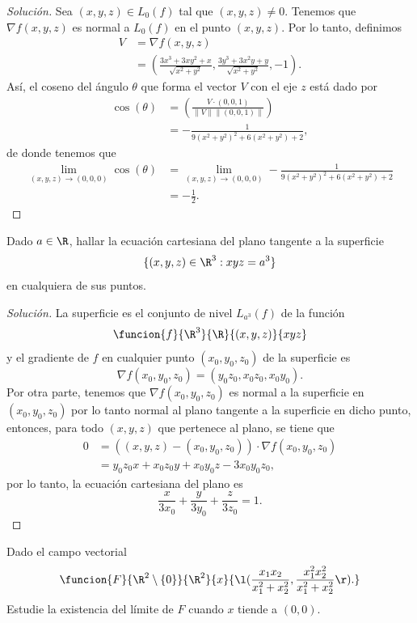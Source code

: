 \documentclass[a4,11pt]{aleph-notas}
\begin{document}
\begin{proof}[Solución]
Sea $(x,y,z)\in L_0(f)$ tal que $(x,y,z)\neq 0$. Tenemos que $\nabla f(x,y,z)$ es normal a $L_0(f)$ en el punto $(x,y,z)$. Por lo tanto, definimos
    \begin{align*}
        V
            & =\nabla f(x,y,z)\\
            & =\left(\frac{3x^3+3xy^2+x}{\sqrt{x^2+y^2}},\frac{3y^3+3x^2y+y}{\sqrt{x^2+y^2}},-1\right).
    \end{align*}
    Así, el coseno del ángulo $\theta$ que forma el vector $V$ con el eje $z$ está dado por
    \begin{align*}
        \cos (\theta)
            & = \left( \frac{V \cdot (0,0,1)}{\|V\| \|(0,0,1)\|} \right) \\
            & = -\frac{1}{9(x^2+y^2)^2+6(x^2+y^2)+2},
    \end{align*}
    de donde tenemos que
    \begin{align*}
        \lim_{(x,y,z) \to (0,0,0)}\cos (\theta)
            & = \lim_{(x,y,z) \to (0,0,0)} -\frac{1}{9(x^2+y^2)^2+6(x^2+y^2)+2} \\
            & = -\frac{1}{2}.
    \end{align*}
\end{proof}

\begin{ejer}
Dado $a\in\R$, hallar la ecuación cartesiana del plano tangente a la superficie 
    \[
       \{(x,y,z)\in\R^3 : xyz=a^3\}
    \]
    en cualquiera de sus puntos.
\end{ejer}

\begin{proof}[Solución]
La superficie es el conjunto de nivel $L_{a^3}(f)$ de la función 
    \[ 
        \funcion {f}{\R^3}{\R}{(x,y,z)}{xyz}
    \]
    y el gradiente de $f$ en cualquier punto $(x_0,y_0,z_0)$ de la superficie es
    \[
        \nabla f(x_0,y_0,z_0)=(y_0z_0,x_0z_0,x_0y_0).
    \]
    Por otra parte, tenemos que $\nabla f(x_0,y_0,z_0)$ es normal a la superficie en $(x_0,y_0,z_0)$ por lo tanto normal al plano tangente a la superficie en dicho punto, entonces, para todo $(x,y,z)$ que pertenece al plano, se tiene que
    \begin{align*}
        0
            & = ((x,y,z)-(x_0,y_0,z_0)) \cdot \nabla f(x_0,y_0,z_0) \\
            & = y_0z_0x+x_0z_0y+x_0y_0z-3x_0y_0z_0,
    \end{align*}
    por lo tanto, la ecuación cartesiana del plano es
    \[
        \frac{x}{3x_0}+\frac{y}{3y_0}+\frac{z}{3z_0}=1.
    \]
\end{proof}

\begin{ejer}
Dado el campo vectorial
	\[
		\funcion{F}{\R^2\setminus\{0\}}{\R^2}{x}{\l(\dfrac{x_1x_2}{x_1^2+x_2^2},\dfrac{x_1^2x_2^2}{x_1^2+x_2^2}\r).}
	\]
	Estudie la existencia del límite de $F$ cuando $x$ tiende a $(0,0)$.
\end{ejer}
\end{document}
